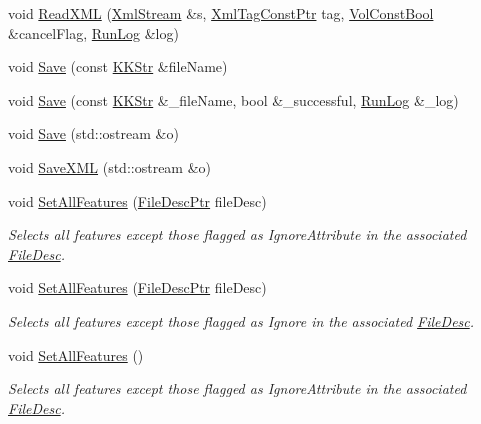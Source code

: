 \begin{DoxyCompactItemize}
void \hyperlink{class_k_k_m_l_l_1_1_feature_num_list_a8fa1e7a5eb1d98c33d0fe9aa786461a5}{Read\+X\+ML} (\hyperlink{class_k_k_b_1_1_xml_stream}{Xml\+Stream} \&s, \hyperlink{namespace_k_k_b_a5f1b0b1667d79fec26deeff10c43df23}{Xml\+Tag\+Const\+Ptr} tag, \hyperlink{namespace_k_k_b_a7d390f568e2831fb76b86b56c87bf92f}{Vol\+Const\+Bool} \&cancel\+Flag, \hyperlink{class_k_k_b_1_1_run_log}{Run\+Log} \&log)
\item 
void \hyperlink{class_k_k_m_l_l_1_1_feature_num_list_ae573b278dc4ad1109bfb3f6e11e71e2e}{Save} (const \hyperlink{class_k_k_b_1_1_k_k_str}{K\+K\+Str} \&file\+Name)
\item 
void \hyperlink{class_k_k_m_l_l_1_1_feature_num_list_a1ad9c0225fdd52d5669357cf082b948c}{Save} (const \hyperlink{class_k_k_b_1_1_k_k_str}{K\+K\+Str} \&\+\_\+file\+Name, bool \&\+\_\+successful, \hyperlink{class_k_k_b_1_1_run_log}{Run\+Log} \&\+\_\+log)
\item 
void \hyperlink{class_k_k_m_l_l_1_1_feature_num_list_a1d822a38a993f109f4a06ecb44b5b930}{Save} (std\+::ostream \&o)
\item 
void \hyperlink{class_k_k_m_l_l_1_1_feature_num_list_a666e350ec3bcb12061f1e6c9eaa027fb}{Save\+X\+ML} (std\+::ostream \&o)
\item 
void \hyperlink{class_k_k_m_l_l_1_1_feature_num_list_a3398feba08e669eac4f99a09772495c9}{Set\+All\+Features} (\hyperlink{namespace_k_k_m_l_l_aa0d0b6ab4ec18868a399b8455b05d914}{File\+Desc\+Ptr} file\+Desc)
\begin{DoxyCompactList}\small\item\em Selects all features except those flagged as \textquotesingle{}Ignore\+Attribute\textquotesingle{} in the associated \hyperlink{class_k_k_m_l_l_1_1_file_desc}{File\+Desc}. \end{DoxyCompactList}\item 
void \hyperlink{class_k_k_m_l_l_1_1_feature_num_list_afcbacd973886d300af224b02f82d3a6d}{Set\+All\+Features} (\hyperlink{namespace_k_k_m_l_l_aa0d0b6ab4ec18868a399b8455b05d914}{File\+Desc\+Ptr} file\+Desc)
\begin{DoxyCompactList}\small\item\em Selects all features except those flagged as \textquotesingle{}Ignore\textquotesingle{} in the associated \hyperlink{class_k_k_m_l_l_1_1_file_desc}{File\+Desc}. \end{DoxyCompactList}\item 
void \hyperlink{class_k_k_m_l_l_1_1_feature_num_list_acd048b5fee162160aa5dd9c8c5a06bb7}{Set\+All\+Features} ()
\begin{DoxyCompactList}\small\item\em Selects all features except those flagged as \textquotesingle{}Ignore\+Attribute\textquotesingle{} in the associated \hyperlink{class_k_k_m_l_l_1_1_file_desc}{File\+Desc}. \end{DoxyCompactList}\item 

\end{DoxyCompactItemize}
